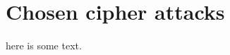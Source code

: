 \documentclass[../master.tex]{subfiles}
\begin{document}
    \section{Chosen cipher attacks}
    here is some text.
\end{document}
